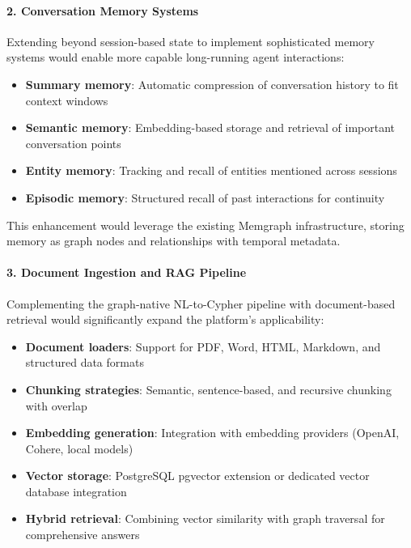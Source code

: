 \paragraph{2. Conversation Memory Systems}

Extending beyond session-based state to implement sophisticated memory systems would enable more capable long-running agent interactions:

\begin{itemize}
    \item \textbf{Summary memory}: Automatic compression of conversation history to fit context windows
    \item \textbf{Semantic memory}: Embedding-based storage and retrieval of important conversation points
    \item \textbf{Entity memory}: Tracking and recall of entities mentioned across sessions
    \item \textbf{Episodic memory}: Structured recall of past interactions for continuity
\end{itemize}

This enhancement would leverage the existing Memgraph infrastructure, storing memory as graph nodes and relationships with temporal metadata.

\paragraph{3. Document Ingestion and RAG Pipeline}

Complementing the graph-native NL-to-Cypher pipeline with document-based retrieval would significantly expand the platform's applicability:

\begin{itemize}
    \item \textbf{Document loaders}: Support for PDF, Word, HTML, Markdown, and structured data formats
    \item \textbf{Chunking strategies}: Semantic, sentence-based, and recursive chunking with overlap
    \item \textbf{Embedding generation}: Integration with embedding providers (OpenAI, Cohere, local models)
    \item \textbf{Vector storage}: PostgreSQL pgvector extension or dedicated vector database integration
    \item \textbf{Hybrid retrieval}: Combining vector similarity with graph traversal for comprehensive answers
\end{itemize}

